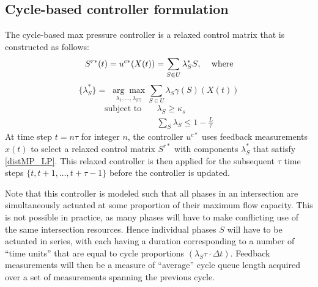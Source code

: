 \subsection*{Cycle-based controller formulation}


The cycle-based max pressure controller is a relaxed control matrix that is constructed as follows:
\begin{equation} \label{uc*} 
S^{r*}(t) = u^{c*} (X(t)) = \sum_{S \in U}\lambda_{S}^{*}S \text{, \quad where}
\end{equation}  
\begin{equation}  \label{distMP_LP}
\{ \lambda^*_S \} = \;  \underset{\lambda_{1},...,\lambda_{\vert U\vert}}{ \arg \max} \sum_{S \in U}\lambda_{S}\gamma(S)(X(t))
\end{equation}
\begin{align*}
\text{subject to} &\quad  \lambda_{S} \geq \kappa_s\\
&\quad \sum_{S} \lambda_{S} \leq 1 - \tfrac{L}{\tau} 
\end{align*}
At time step $t=n\tau$ for integer $n$, the controller $u^{c*}$ uses feedback measurements $x(t)$ to select a relaxed control matrix $S^{r*}$ with components $\lambda_S^*$ that satisfy \eqref{distMP_LP}. This relaxed controller is then applied for the subsequent $\tau$ time steps $\{t, t+1, \ldots, t+\tau-1\}$ before the controller is updated. 

Note that this controller is modeled such that all phases in an intersection are simultaneously actuated at some proportion of their maximum flow capacity. This is not possible in practice, as many phases will have to make conflicting use of the same intersection resources. Hence individual phases $S$ will have to be actuated in series, with each having a duration corresponding to a number of ``time units'' that are equal to cycle proportions $(\lambda_S \tau\cdot  \Delta t)$. Feedback measurements will then be a measure of ``average'' cycle queue length acquired over a set of measurements spanning the previous cycle.  


